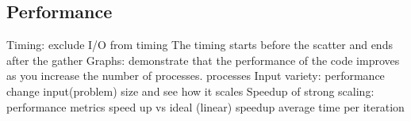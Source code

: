 \documentclass[12pt,a4paper]{article}
\newcommand{\sectionVspacing}{\vspace{15pt}}
\begin{document}
\subsection{Performance}

Timing: exclude I/O from timing The timing starts before the scatter and ends after the gather
Graphs: demonstrate that the performance of the code improves as you increase the number of processes.
	 processes
	 Input variety: performance change input(problem) size and see how it scales
	 Speedup of strong scaling: performance metrics speed up vs ideal (linear) speedup 
	 average time per iteration

\sectionVspacing


\end{document}
